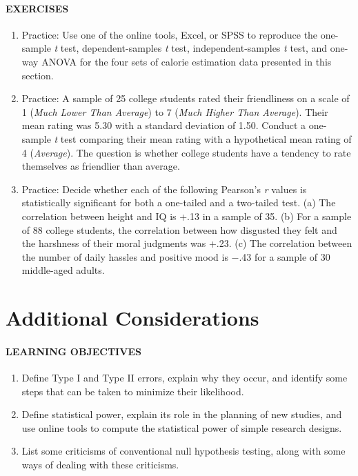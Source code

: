 \documentclass[
]{krantz}
\providecommand{\tightlist}{%
  \setlength{\itemsep}{0pt}\setlength{\parskip}{0pt}}
\begin{document}
\hypertarget{exercises-31}{%
\paragraph*{EXERCISES}\label{exercises-31}}

\begin{enumerate}
\def\labelenumi{\arabic{enumi}.}
\tightlist
\item
  Practice: Use one of the online tools, Excel, or SPSS to reproduce the one-sample \emph{t} test, dependent-samples \emph{t} test, independent-samples \emph{t} test, and one-way ANOVA for the four sets of calorie estimation data presented in this section.
\item
  Practice: A sample of 25 college students rated their friendliness on a scale of 1 (\emph{Much Lower Than Average}) to 7 (\emph{Much Higher Than Average}). Their mean rating was 5.30 with a standard deviation of 1.50. Conduct a one-sample \emph{t} test comparing their mean rating with a hypothetical mean rating of 4 (\emph{Average}). The question is whether college students have a tendency to rate themselves as friendlier than average.
\item
  Practice: Decide whether each of the following Pearson's \emph{r} values is statistically significant for both a one-tailed and a two-tailed test. (a) The correlation between height and IQ is +.13 in a sample of 35. (b) For a sample of 88 college students, the correlation between how disgusted they felt and the harshness of their moral judgments was +.23. (c) The correlation between the number of daily hassles and positive mood is −.43 for a sample of 30 middle-aged adults.
\end{enumerate}

\hypertarget{additional-considerations}{%
\section{Additional Considerations}\label{additional-considerations}}

\hypertarget{learning-objectives-40}{%
\paragraph*{LEARNING OBJECTIVES}\label{learning-objectives-40}}

\begin{enumerate}
\def\labelenumi{\arabic{enumi}.}
\tightlist
\item
  Define Type I and Type II errors, explain why they occur, and identify some steps that can be taken to minimize their likelihood.
\item
  Define statistical power, explain its role in the planning of new studies, and use online tools to compute the statistical power of simple research designs.
\item
  List some criticisms of conventional null hypothesis testing, along with some ways of dealing with these criticisms.
\end{enumerate}
\end{document}

